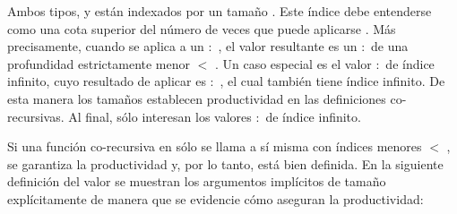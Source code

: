 
Ambos tipos,  y  están indexados por un tamaño . Este índice debe entenderse como una cota superior del número de veces que puede aplicarse . Más precisamente, cuando se aplica  a un  $:$  , el valor resultante es un  $:$   de una profundidad estrictamente menor  $<$ . Un caso especial es el valor  $:$  \AgdaDatatype{$\infty$} de índice infinito, cuyo resultado de aplicar  es  $:$ , el cual también tiene índice infinito. De esta manera los tamaños establecen productividad en las definiciones co-recursivas. Al final, sólo interesan los valores  $:$  de índice infinito.

Si una función co-recursiva en   sólo se llama a sí misma con índices menores  $<$ , se garantiza la productividad y, por lo tanto, está bien definida. En la siguiente definición del valor  se muestran los argumentos implícitos de tamaño explícitamente de manera que se evidencie cómo aseguran la productividad:

